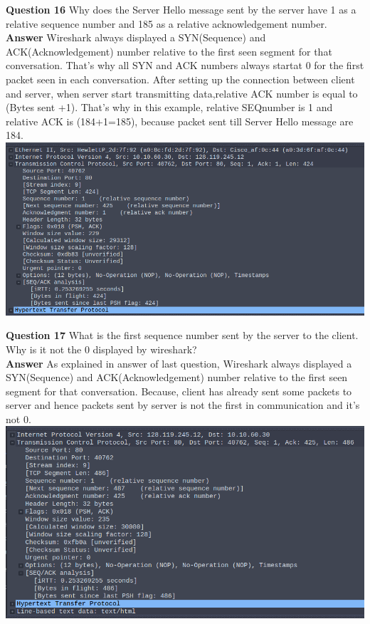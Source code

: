 \documentclass[14pt]{extarticle}
\begin{document}
    \noindent
    \textbf{\large Question 16}
    Why does the Server Hello message sent by the server have 1 as a relative sequence number
and 185 as a relative acknowledgement number.\\[10pt]
    \textbf{\large Answer}
    Wireshark always displayed a SYN(Sequence) and ACK(Acknowledgement) number relative to the first seen segment for that conversation. 
    That’s why all SYN and ACK numbers always startat 0 for the first packet seen in each conversation.
    After setting up the connection between client and server, when server start transmitting data,relative ACK number is equal to (Bytes sent +1). 
    That’s why in this example, relative SEQnumber is 1 and relative ACK is (184+1=185), because packet sent till Server Hello message are 184. \\[10pt]
    \includegraphics[scale=0.5]{16}
    \vspace{1cm}

    \noindent
    \textbf{\large Question 17}
    What is the first sequence number sent by the server to the client. Why is it not the 0
displayed by wireshark?\\[10pt]
    \textbf{\large Answer}
    As explained in answer of last question, Wireshark always displayed a SYN(Sequence) and ACK(Acknowledgement) number relative to the first seen segment for that conversation.
    Because, client has already sent some packets to server and hence packets sent by server is not the first in communication and it's not 0. \\[10pt]
    \includegraphics[scale=0.5]{17}
    \vspace{1cm}
    
    
\end{document}
